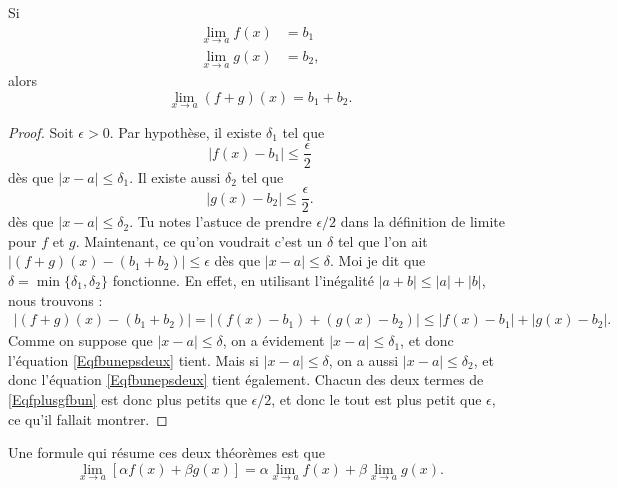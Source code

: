 \begin{theorem}     \label{ThoLimLin}
    Si
    \begin{subequations}
    \begin{align}
        \lim_{x\to a}f(x)&=b_1\\
        \lim_{x\to a}g(x)&=b_2,
    \end{align}
    \end{subequations}
    alors
    \begin{equation}
        \lim_{x\to a}(f+g)(x)=b_1+b_2.
    \end{equation}
\end{theorem}

\begin{proof}
    Soit $\epsilon>0$. Par hypothèse, il existe $\delta_1$ tel que
    \begin{equation}    \label{Eqfbunepsdeux}
      | f(x)-b_1 |\leq \frac{ \epsilon }{ 2 }
    \end{equation}
    dès que $| x-a |\leq\delta_1$. Il existe aussi $\delta_2$ tel que 
    \begin{equation}    \label{Eqgbdeuxepsdeux}
      | g(x)-b_2 |\leq \frac{ \epsilon }{ 2 }.
    \end{equation}
    dès que $| x-a |\leq \delta_2$. Tu notes l'astuce de prendre $\epsilon/2$ dans la définition de limite pour $f$ et $g$. Maintenant, ce qu'on voudrait c'est un $\delta$ tel que l'on ait $| (f+g)(x)-(b_1+b_2) |\leq \epsilon$ dès que $| x-a |\leq \delta$. Moi je dit que $\delta=\min\{ \delta_1,\delta_2 \}$ fonctionne. En effet, en utilisant l'inégalité $| a+b |\leq | a |+| b |$, nous trouvons :
    \begin{align}
    | (f+g)(x)-(b_1+b_2) |=| (f(x)-b_1)+(g(x)-b_2) |
            \leq | f(x)-b_1 |+| g(x)-b_2 |.     \label{Eqfplusgfbun}
    \end{align}
    Comme on suppose que $| x-a |\leq\delta$, on a évidement $| x-a |\leq\delta_1$, et donc l'équation \eqref{Eqfbunepsdeux} tient. Mais si $| x-a |\leq\delta$, on a aussi $| x-a |\leq\delta_2$, et donc l'équation  \eqref{Eqfbunepsdeux} tient également. Chacun des deux termes de \eqref{Eqfplusgfbun} est donc plus petits que $\epsilon/2$, et donc le tout est plus petit que $\epsilon$, ce qu'il fallait montrer.

\end{proof}

Une formule qui résume ces deux théorèmes est que
\begin{equation}    \label{EqLimLinRes}
    \lim_{x\to a}[\alpha f(x)+\beta g(x)]=\alpha\lim_{x\to a}f(x)+\beta\lim_{x\to a}g(x).
\end{equation}

